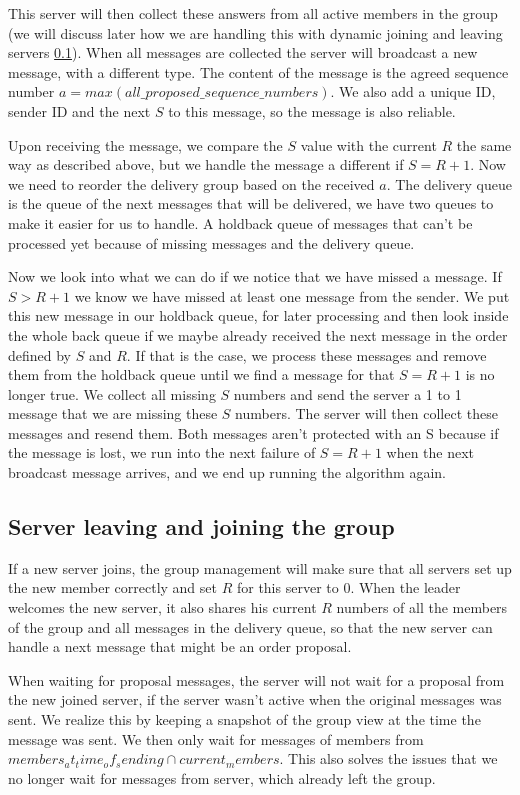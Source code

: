 \documentclass[runningheads]{llncs}
\begin{document}
This server will then collect these answers from all active members in the
group (we will discuss later how we are handling this with dynamic joining and
leaving servers \ref{multicastchanges}). When all messages are collected the
server will broadcast a new message, with a different type. The content of the
message is the agreed sequence number $a =
max(all\_proposed\_sequence\_numbers)$. We also add a unique ID, sender ID and
the next $S$ to this message, so the message is also reliable.

Upon receiving the message, we compare the $S$ value with the current $R$ the
same way as described above, but we handle the message a different if $S = R +
1$. Now we need to reorder the delivery group based on the received $a$. The
delivery queue is the queue of the next messages that will be delivered, we
have two queues to make it easier for us to handle. A holdback queue of
messages that can't be processed yet because of missing messages and the
delivery queue.

Now we look into what we can do if we notice that we have missed a message. If
$S > R + 1$ we know we have missed at least one message from the sender. We put
this new message in our holdback queue, for later processing and then look
inside the whole back queue if we maybe already received the next message in
the order defined by $S$ and $R$. If that is the case, we process these
messages and remove them from the holdback queue until we find a message for
that $S = R + 1$ is no longer true. We collect all missing $S$ numbers and send
the server a 1 to 1 message that we are missing these $S$ numbers. The server
will then collect these messages and resend them. Both messages aren't
protected with an S because if the message is lost, we run into the next
failure of $S = R + 1$ when the next broadcast message arrives, and we end up
running the algorithm again.

\subsection{Server leaving and joining the group} \label{multicastchanges}

If a new server joins, the group management will make sure that all servers set
up the new member correctly and set $R$ for this server to 0. When the leader
welcomes the new server, it also shares his current $R$ numbers of all the
members of the group and all messages in the delivery queue, so that the new
server can handle a next message that might be an order proposal.

When waiting for proposal messages, the server will not wait for a proposal
from the new joined server, if the server wasn't active when the original
messages was sent. We realize this by keeping a snapshot of the group view at
the time the message was sent. We then only wait for messages of members from
$members_at_time_of_sending \cap current_members$. This also solves the issues
that we no longer wait for messages from server, which already left the group.
\end{document}
